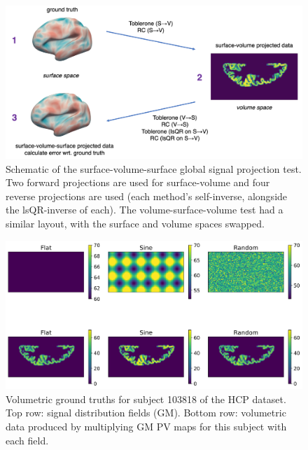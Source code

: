 \documentclass[12pt]{report}
\begin{document}
\begin{figure}[H]
\centering
\includegraphics[width=\textwidth]{SVS_schematic}
\caption{Schematic of the surface-volume-surface global signal projection test. Two forward projections are used for surface-volume and four reverse projections are used (each method's self-inverse, alongside the lsQR-inverse of each). The volume-surface-volume test had a similar layout, with the surface and volume spaces swapped.}
\label{SVS_schematic} 
\end{figure}

\begin{figure}[H]
\centering
\includegraphics[width=\textwidth]{vtruths}
\caption{Volumetric ground truths for subject 103818 of the HCP dataset. Top row: signal distribution fields (GM). Bottom row: volumetric data produced by multiplying GM PV maps for this subject with each field.}
\label{vol_truth} 
\end{figure}
\end{document}
